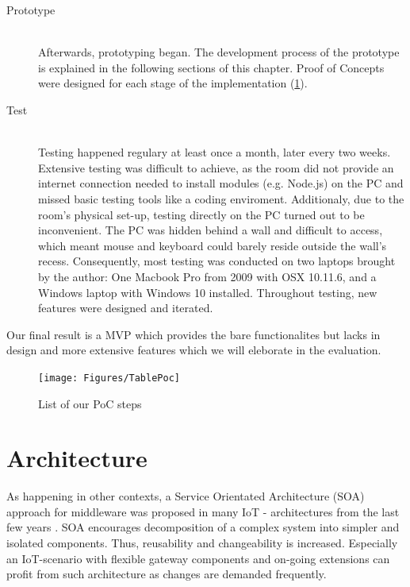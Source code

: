 \begin{description}
	\item [Prototype]\hfill \\
		 Afterwards, prototyping began. 
		 The development process of the prototype is explained in the following sections of this chapter.
	    Proof of Concepts were designed for each stage of the implementation (\ref{fig:PoC}).
	\item [Test]\hfill \\
		  Testing happened regulary at least once a month, later every two weeks.
		Extensive testing was difficult to achieve, as the room did not provide 
		   an internet connection needed to install modules (e.g. Node.js) on the PC 
		   and missed basic testing tools like a coding enviroment. 
		   Additionaly, due to the room's physical set-up, testing directly on the PC turned out 
		   to be inconvenient. The PC was hidden behind a wall and difficult to access, 
		   which meant mouse and keyboard could barely reside outside the wall's recess.
		   Consequently, most testing was conducted on two laptops brought by the author: 
		   One Macbook Pro from 2009 with OSX 10.11.6, and a Windows laptop with Windows 10 installed.
		   Throughout testing, new features were designed and iterated.
\end{description}

Our final result is a MVP %
which provides the bare functionalites but lacks in design 
and more extensive features which we will eleborate in the evaluation.

\begin{figure}[th]
	\centering
	\texttt{[image: Figures/TablePoc]}
	\decoRule
	\caption[Proof of Concept Steps]{List of our PoC steps}
	\label{fig:PoC}
\end{figure}


\section{Architecture}

As happening in other contexts, 
a Service Orientated Architecture (SOA) approach for middleware 
was proposed in many IoT - architectures from the last few years \parencite{archsurv1}. 
SOA encourages decomposition of a complex system into simpler and isolated components.
Thus, reusability and changeability is increased. 
Especially an IoT-scenario with flexible gateway components and on-going extensions can profit from such 
architecture as changes are demanded frequently.
\parencite{archsurv1}

